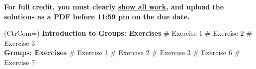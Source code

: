 \documentclass[11pt]{book}
\begin{document}
\thispagestyle{fancy}
\noindent	\textbf{For full credit, you must clearly \underline{show all work}, and upload the solutions as a PDF before 11:59 pm on the due date.}\hfill
\vspace{0.3in}

\begin{easylist}
\ListProperties(CtrCom=\fbox)
\noindent \textbf{Introduction to Groups: Exercises}
\vspace{0.5in}
# Exercise 1
\vspace{0.2in}
# Exercise 2
\vspace{0.2in}
# Exercise 3\\

\vspace{0.5in}
\noindent \textbf{Groups: Exercises}
\vspace{0.5in}
# Exercise 1
\vspace{0.2in}
# Exercise 2
\vspace{0.2in}
# Exercise 3
\vspace{0.2in}
# Exercise 6 
\vspace{0.2in}
# Exercise 7
 \end{easylist}
\end{document}
